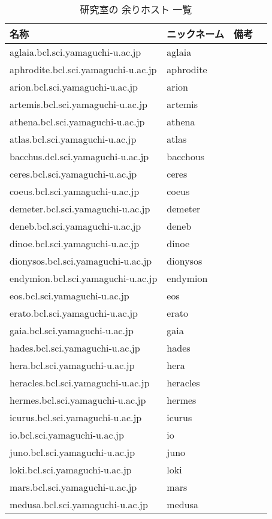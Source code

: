 \documentclass{jarticle}
\begin{document}
{\small
\begin{table}[tbp]
\centering
\caption{研究室の 余りホスト 一覧} \label{tab:host}
\begin{tabular}[t]{llll}\hline
名称 &					ニックネーム &	備考 \\ \hline
aglaia.bcl.sci.yamaguchi-u.ac.jp &	aglaia & \\
aphrodite.bcl.sci.yamaguchi-u.ac.jp &	aphrodite & \\
arion.bcl.sci.yamaguchi-u.ac.jp &	arion & \\
artemis.bcl.sci.yamaguchi-u.ac.jp &	artemis & \\
athena.bcl.sci.yamaguchi-u.ac.jp &	athena & \\
atlas.bcl.sci.yamaguchi-u.ac.jp &	atlas & \\
bacchus.dcl.sci.yamaguchi-u.ac.jp &	bacchous & \\
ceres.bcl.sci.yamaguchi-u.ac.jp &	ceres & \\
coeus.bcl.sci.yamaguchi-u.ac.jp &	coeus &  \\
demeter.bcl.sci.yamaguchi-u.ac.jp &	demeter & \\
deneb.bcl.sci.yamaguchi-u.ac.jp &	deneb & \\
dinoe.bcl.sci.yamaguchi-u.ac.jp &	dinoe & \\
dionysos.bcl.sci.yamaguchi-u.ac.jp &	dionysos & \\
endymion.bcl.sci.yamaguchi-u.ac.jp &	endymion & \\
eos.bcl.sci.yamaguchi-u.ac.jp &		eos & \\
erato.bcl.sci.yamaguchi-u.ac.jp &	erato & \\
gaia.bcl.sci.yamaguchi-u.ac.jp &	gaia & \\
hades.bcl.sci.yamaguchi-u.ac.jp &	hades & \\
hera.bcl.sci.yamaguchi-u.ac.jp &	hera & \\
heracles.bcl.sci.yamaguchi-u.ac.jp &	heracles & \\
hermes.bcl.sci.yamaguchi-u.ac.jp &	hermes & \\
icurus.bcl.sci.yamaguchi-u.ac.jp &	icurus & \\
io.bcl.sci.yamaguchi-u.ac.jp &		io & \\
juno.bcl.sci.yamaguchi-u.ac.jp &	juno & \\
loki.bcl.sci.yamaguchi-u.ac.jp &	loki & \\
mars.bcl.sci.yamaguchi-u.ac.jp &	mars & \\
medusa.bcl.sci.yamaguchi-u.ac.jp &	medusa & \\

\end{tabular}
\end{table}}
\end{document}
